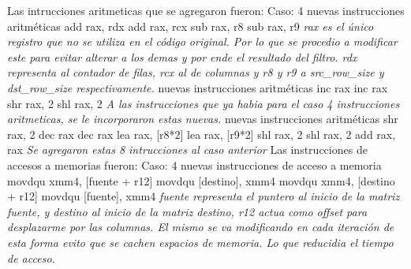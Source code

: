 \documentclass[a4paper]{article}
\begin{document}
Las intrucciones aritmeticas que se agregaron fueron:\newline
Caso: 4 nuevas instrucciones aritméticas 
add rax, rdx \newline
add rax, rcx\newline
sub rax, r8\newline
sub rax, r9\newline
\textit{rax es el único registro que no se utiliza en el código original. Por lo que se procedio a modificar este para evitar alterar a los demas y por ende el resultado del filtro. rdx representa al contador de filas, rcx al de columnas y r8 y r9 a src\_row\_size y dst\_row\_size respectivamente.} nuevas instrucciones aritméticas \newline	
inc rax\newline
inc rax\newline
shr rax, 2\newline
shl rax, 2\newline
\textit{A las instrucciones que ya habia para el caso 4 instrucciones aritmeticas, se le incorporaron estas nuevas.} nuevas instrucciones aritméticas \newline
shr rax, 2\newline
dec rax\newline
dec rax\newline
lea rax, [r8*2]\newline
lea rax, [r9*2]\newline
shl rax, 2\newline
shl rax, 2\newline
add rax, rax\newline
\textit{Se agregaron estas 8 intrucciones al caso anterior}\newline
Las instrucciones de accesos a memorias fueron:\newline
Caso: 4 nuevas instrucciones de acceso a memoria\newline
movdqu xmm4, [fuente + r12]\newline
movdqu [destino], xmm4\newline
movdqu xmm4, [destino + r12]\newline
movdqu [fuente], xmm4\newline
\textit{fuente representa el puntero al inicio de la matriz fuente, y destino al inicio de la matriz destino, r12 actua como offset para desplazarme por las columnas. El mismo se va modificando en cada iteración de esta forma evito que se cachen espacios de memoria. Lo que reducidia el tiempo de acceso.}\newline
\end{document}
